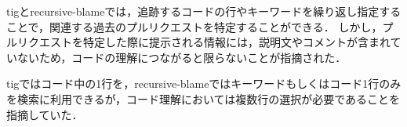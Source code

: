 tigとrecursive-blameでは，追跡するコードの行やキーワードを繰り返し指定することで，関連する過去のプルリクエストを特定することができる．
しかし，プルリクエストを特定した際に提示される情報には，説明文やコメントが含まれていないため，コードの理解につながると限らないことが指摘された．





tigではコード中の1行を，recursive-blameではキーワードもしくはコード1行のみを検索に利用できるが，コード理解においては複数行の選択が必要であることを指摘していた．




